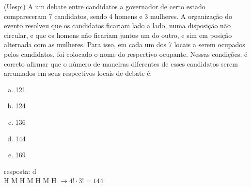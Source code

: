 \begin{ex}
(Uespi) A um debate entre candidatos a governador de certo estado compareceram 7 candidatos, sendo 4 homens e 3 mulheres. A organização do evento resolveu que os candidatos ficariam lado a lado, numa disposição não circular, e que os homens não ficariam juntos um do outro, e sim em posição alternada com as mulheres.	Para isso, em cada um dos 7 locais a serem ocupados pelos candidatos, foi colocado o nome do respectivo ocupante. Nessas condições, é correto afirmar que o número de maneiras diferentes de esses candidatos serem arrumados em seus respectivos locais de debate é:
   \begin{enumerate}[(a)]
   \item 121
   \item 124
   \item 136
   \item 144
   \item 169
   \end{enumerate}
    \begin{sol}
    resposta: d \\
    H M H M H M H $\rightarrow 4!\cdot3!=144$
    \end{sol}
\end{ex}
